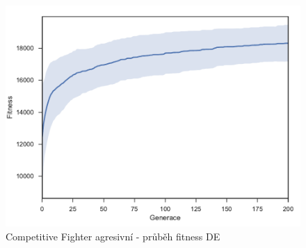 \begin{figure}[p]\centering
	\includegraphics[width=\columnwidth]{../img/CompetitiveMap/FighterKeep}
	\caption{Competitive Fighter agresivní - průběh fitness DE}
	\label{obr04:CompetitiveFighterAgresive}
\end{figure}
\clearpage

